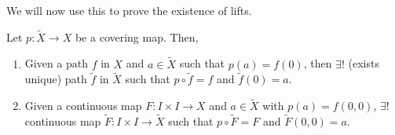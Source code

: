     We will now use this to prove the existence of lifts.
    \begin{theorem}
    Let $p: \widetilde{X} \to X$ be a covering map. Then,
    \begin{enumerate}
\item Given a path $f$ in $X$ and $a \in \widetilde{X}$ such that $p(a) = f(0)$, then $\exists !$ (exists unique) path $\widetilde{f}$ in $\widetilde{X}$ such that $p \circ \widetilde{f} = f$ and $\widetilde{f}(0) = a$.
\item Given a continuous map $F: I \times I \to X$ and $a \in \widetilde{X}$ with $p(a) = f(0,0)$, $\exists !$ continuous map $\widetilde{F}$$\colon I \times I \to \widetilde{X}$ such that $p \circ \widetilde{F} = F$ and $\widetilde{F}(0,0) = a$.
\end{enumerate}
\end{theorem}
